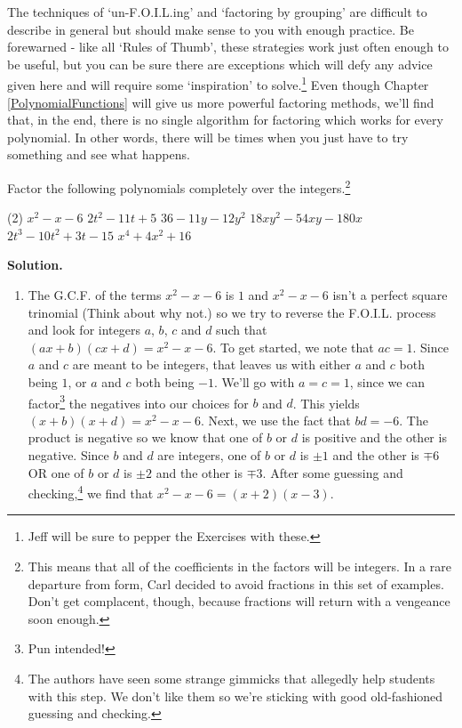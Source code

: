 The techniques of `un-F.O.I.L.ing' and `factoring by grouping' are difficult to describe in general but should make sense to you with enough practice.  Be forewarned - like all `Rules of Thumb', these strategies work just often enough to be useful, but you can be sure there are exceptions which will defy any advice given here and will require some `inspiration' to solve.\footnote{Jeff will be sure to pepper the Exercises with these.} Even though Chapter \ref{PolynomialFunctions} will give us more powerful factoring methods, we'll find that, in the end, there is no single algorithm for factoring which works for every polynomial. In other words, there will be times when you just have to try something and see what happens.

\begin{ex}\label{advfactoring}  Factor the following polynomials completely over the integers.\footnote{This means that all of the coefficients in the factors will be integers. In a rare departure from form, Carl decided to avoid fractions in this set of examples.  Don't get complacent, though, because fractions will return with a vengeance soon enough.}

\begin{tasks}(2)
\task  $x^2 - x - 6$  
\task  $2t^2 - 11t + 5$
\task  $36 - 11y - 12y^2$
\task  $18xy^2 - 54xy - 180x$
\task  $2t^3 - 10t^2 + 3t - 15$ 
\task  $x^4 + 4x^2 + 16$
\end{tasks}

{\bf Solution.}

\begin{enumerate}

\item  The G.C.F. of the terms $x^2 - x - 6$  is $1$ and $x^2 - x - 6$ isn't a perfect square trinomial (Think about why not.) so we try to reverse the F.O.I.L. process and look for integers $a$, $b$, $c$ and $d$ such that $(ax + b)(cx + d) = x^2 - x - 6$.  To get started, we note that $ac = 1$.  Since $a$ and $c$ are meant to be integers, that leaves us with either $a$ and $c$ both being $1$, or $a$ and $c$ both being $-1$.  We'll go with $a = c = 1$, since we can factor\footnote{Pun intended!} the negatives into our choices for $b$ and $d$.  This yields $(x+b)(x+d) = x^2-x-6$.  Next, we use the fact that $bd = -6$.  The product is negative so we know that one of $b$ or $d$ is positive and the other is negative.  Since $b$ and $d$ are integers, one of $b$ or $d$ is $\pm 1$ and the other is $\mp 6$ OR one of $b$ or $d$ is $\pm 2$ and the other is $\mp 3$. After some guessing and checking,\footnote{The authors have seen some strange gimmicks that allegedly help students with this step.  We don't like them so we're sticking with good old-fashioned guessing and checking.} we find that $x^2 - x - 6 = (x+2)(x-3)$.


\end{enumerate}
\end{ex}
